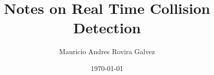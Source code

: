 \documentclass[11pt, letterpaper, oneside]{book}
\title{Notes on Real Time Collision Detection}
\author{Mauricio Andres Rovira Galvez}
\date{\today}
\begin{document}
  \maketitle

  \tableofcontents
  \listofalgorithms
  \lstlistoflistings

  
  
  
\end{document}
